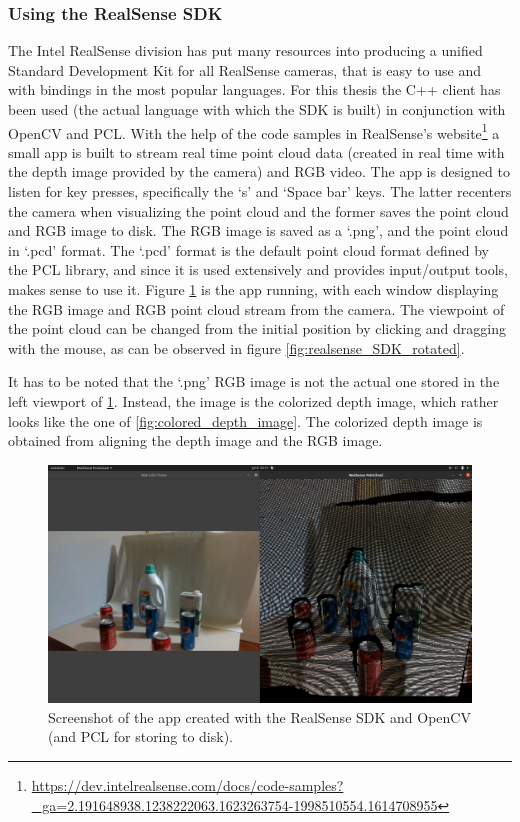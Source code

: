 \documentclass[../main.tex]{subfiles}
\begin{document}
\subsubsection{Using the RealSense SDK} \label{sec:using_realsense_sdk}
The Intel RealSense division has put many resources into producing a unified Standard Development Kit for all RealSense cameras, that is easy to use and with bindings in the most popular languages. For this thesis the C++ client has been used (the actual language with which the SDK is built) in conjunction with OpenCV and PCL. With the help of the code samples in RealSense's website\footnote{\url{https://dev.intelrealsense.com/docs/code-samples?_ga=2.191648938.1238222063.1623263754-1998510554.1614708955}} a small app is built to stream real time point cloud data (created in real time with the depth image provided by the camera) and RGB video. The app is designed to listen for key presses, specifically the `s' and `Space bar' keys. The latter recenters the camera when visualizing the point cloud and the former saves the point cloud and RGB image to disk. The RGB image is saved as a `.png', and the point cloud in `.pcd' format. The `.pcd' format is the default point cloud format defined by the PCL library, and since it is used extensively and provides input/output tools, makes sense to use it. Figure \ref{fig:realsense_SDK_1} is the app running, with each window displaying the RGB image and RGB point cloud stream from the camera. The viewpoint of the point cloud can be changed from the initial position by clicking and dragging with the mouse, as can be observed in figure \ref{fig:realsense_SDK_rotated}.

It has to be noted that the `.png' RGB image is not the actual one stored in the left viewport of \ref{fig:realsense_SDK_1}. Instead, the image is the colorized depth image, which rather looks like the one of \ref{fig:colored_depth_image}. The colorized depth image is obtained from aligning the depth image and the RGB image.

\begin{figure}[h]
    \centering
    \includegraphics[width=1\linewidth]{images/realsense_SDK_1.png}
    \caption{Screenshot of the app created with the RealSense SDK and OpenCV (and PCL for storing to disk).}
    \label{fig:realsense_SDK_1}
\end{figure}
\end{document}
